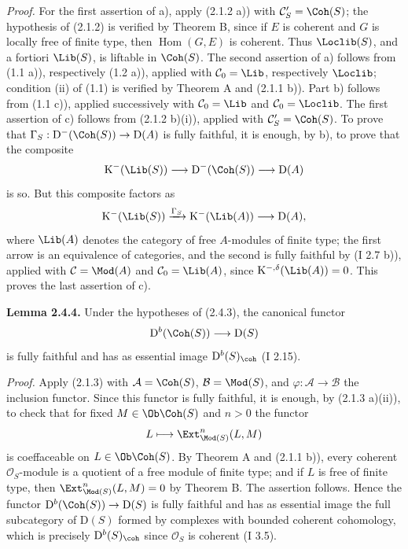 \emph{Proof.} For the first assertion of a), apply (2.1.2 a)) with $\mathcal C'_S=\Coh(S)$; the hypothesis of (2.1.2) is verified by Theorem B, since if $E$ is coherent and $G$ is locally free of finite type, then $\operatorname{Hom}(G,E)$ is coherent. Thus $\Loclib(S)$, and a fortiori $\Lib(S)$, is liftable in $\Coh(S)$. The second assertion of a) follows from (1.1 a)), respectively (1.2 a)), applied with $\mathcal C_0=\Lib$, respectively $\Loclib$; condition (ii) of (1.1) is verified by Theorem A and (2.1.1 b)). Part b) follows from (1.1 c)), applied successively with $\mathcal C_0=\Lib$ and $\mathcal C_0=\Loclib$. The first assertion of c) follows from (2.1.2 b)(i)), applied with $\mathcal C'_S=\Coh(S)$. To prove that $\Gamma_S:\mathrm D^{-}(\Coh(S))\to\mathrm D(A)$ is fully faithful, it is enough, by b), to prove that the composite
\[
\mathrm K^{-}(\Lib(S))\longrightarrow\mathrm D^{-}(\Coh(S))\longrightarrow\mathrm D(A)
\]
is so. But this composite factors as
\[
\mathrm K^{-}(\Lib(S))\xrightarrow{\Gamma_S}\mathrm K^{-}(\Lib(A))\longrightarrow\mathrm D(A),
\]
where $\Lib(A)$ denotes the category of free $A$-modules of finite type; the first arrow is an equivalence of categories, and the second is fully faithful by (I 2.7 b)), applied with $\mathcal C=\Mod(A)$ and $\mathcal C_0=\Lib(A)$, since $\mathrm K^{-,\delta}(\Lib(A))=0$. This proves the last assertion of c).

\textbf{Lemma 2.4.4.} Under the hypotheses of (2.4.3), the canonical functor
\[
\mathrm D^b(\Coh(S))\longrightarrow\mathrm D(S)
\]
is fully faithful and has as essential image $\mathrm D^b(S)_{\coh}$ (I 2.15).

\emph{Proof.} Apply (2.1.3) with $\mathcal A=\Coh(S)$, $\mathcal B=\Mod(S)$, and $\varphi:\mathcal A\to\mathcal B$ the inclusion functor. Since this functor is fully faithful, it is enough, by (2.1.3 a)(ii)), to check that for fixed $M\in\Ob\Coh(S)$ and $n>0$ the functor
\[
L\longmapsto \Ext^n_{\Mod(S)}(L,M)
\]
is coeffaceable on $L\in\Ob\Coh(S)$. By Theorem A and (2.1.1 b)), every coherent $\mathcal O_S$-module is a quotient of a free module of finite type; and if $L$ is free of finite type, then $\Ext^n_{\Mod(S)}(L,M)=0$ by Theorem B. The assertion follows. Hence the functor $\mathrm D^b(\Coh(S))\to\mathrm D(S)$ is fully faithful and has as essential image the full subcategory of $\mathrm D(S)$ formed by complexes with bounded coherent cohomology, which is precisely $\mathrm D^b(S)_{\coh}$ since $\mathcal O_S$ is coherent (I 3.5).

